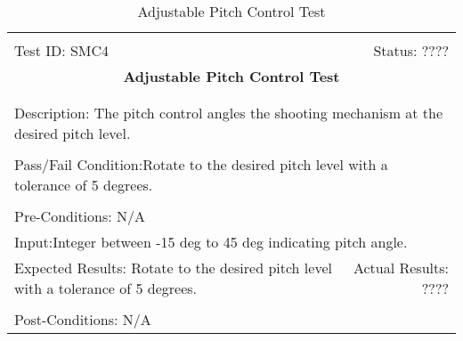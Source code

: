 \documentclass[11pt]{article}
\begin{document}
\begin{center}
\begin{table}[H]
\begin{tabular}{|l r|}\hline&\\[-2mm]
	Test ID: SMC4	&Status: ????\\[-3mm]
	\multicolumn{2}{|c|}{\textbf{\large{Adjustable Pitch Control Test}}}\\&\\\hline&\\[-3mm]
	\multicolumn{2}{|p{\textwidth}|}{Description: The pitch control angles the shooting mechanism at the desired pitch level.}\\[1mm]\hline&\\[-3mm]
	\multicolumn{2}{|p{\textwidth}|}{Pass/Fail Condition:Rotate to the desired pitch level with a tolerance of 5 degrees.}\\[1mm]\hline&\\[-3mm]
	\multicolumn{2}{|p{\textwidth}|}{Pre-Conditions: N/A}\\[4mm]
	\multicolumn{2}{|p{\textwidth}|}{Input:Integer between -15 deg to 45 deg indicating pitch angle.}\\[2mm]\hline
	\multicolumn{1}{|p{0.49\textwidth}}{Expected Results: Rotate to the desired pitch level with a tolerance of 5 degrees.
}	&\multicolumn{1}{|p{0.45\textwidth}|}{Actual Results: ????}\\\hline&\\[-3mm]
	\multicolumn{2}{|p{\textwidth}|}{Post-Conditions: N/A}\\\hline
\end{tabular}
\caption{Adjustable Pitch Control Test}
\end{table}
\end{center}
\end{document}
